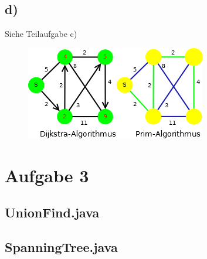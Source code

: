 \documentclass[a4paper,11pt,twoside]{scrartcl}
\begin{document}
\subsection*{d)}
Siehe Teilaufgabe c)
\begin{figure}[H]
	\centering
	\includegraphics*[scale=0.75]{Bilder/2c_Unterschied}
\end{figure}

\clearpage
\vspace*{-50pt}
\section*{Aufgabe 3}
\vspace*{-10pt}
\subsection*{UnionFind.java}
\vspace*{-15pt}

\pagebreak
\subsection*{SpanningTree.java}

\end{document}
